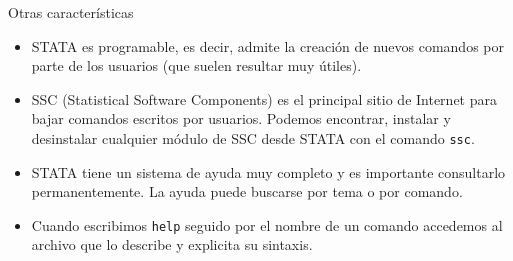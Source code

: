 \documentclass{beamer}
\begin{document}
\begin{frame}{Otras características}
 \begin{itemize}
\item STATA es programable, es decir, admite la creación de nuevos comandos por parte de los usuarios (que suelen resultar muy útiles). 
\item SSC (Statistical Software Components) es el principal sitio de Internet para bajar comandos escritos por usuarios. Podemos encontrar, instalar y desinstalar cualquier módulo de SSC desde STATA con el comando \texttt{ssc}. 
\item STATA tiene un sistema de ayuda muy completo y es importante consultarlo permanentemente. La ayuda puede buscarse por tema o por comando. 
\item Cuando escribimos \texttt{help} seguido por el nombre de un comando accedemos al archivo que lo describe y explicita su sintaxis. 
\end{itemize}
\end{frame}
\end{document}
